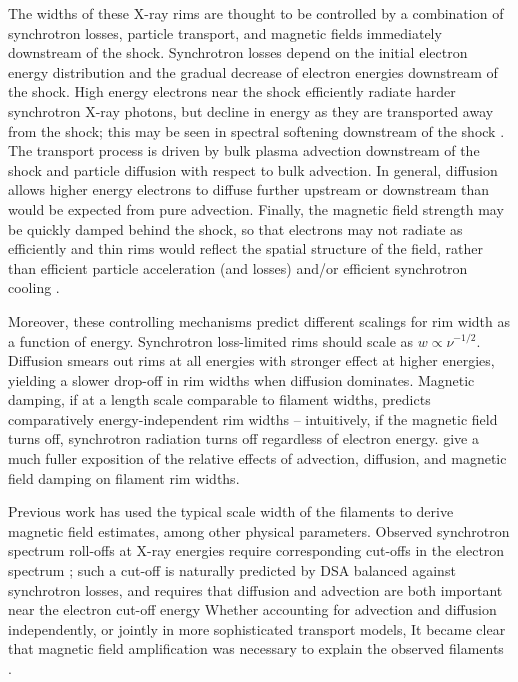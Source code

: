 \documentclass[iop, apj, numberedappendix, twocolappendix]{emulateapj}
\begin{document}
The widths of these X-ray rims are thought to be controlled by a combination of
synchrotron losses, particle transport, and magnetic fields immediately
downstream of the shock.  Synchrotron losses depend on the initial electron
energy distribution and the gradual decrease of electron energies downstream of
the shock.  High energy electrons near the shock efficiently radiate harder
synchrotron X-ray photons, but decline in energy as they are transported away
from the shock; this may be seen in spectral softening downstream of the shock
\citep[e.g.,][]{cassam-chenai2007}.  The transport process is driven by bulk
plasma advection downstream of the shock and particle diffusion with respect to
bulk advection.  In general, diffusion allows higher energy electrons to
diffuse further upstream or downstream than would be expected from pure
advection.  Finally, the magnetic field strength may be quickly damped behind
the shock, so that electrons may not radiate as efficiently and thin rims would
reflect the spatial structure of the field, rather than efficient particle
acceleration (and losses) and/or efficient synchrotron cooling
\citep{pohl2005}.

Moreover, these controlling mechanisms predict different scalings for rim width
as a function of energy.  Synchrotron loss-limited rims should scale as $w
\propto \nu^{-1/2}$.  Diffusion smears out rims at all energies with stronger
effect at higher energies, yielding a slower drop-off in rim widths when
diffusion dominates.  Magnetic damping, if at a length scale comparable to
filament widths, predicts comparatively energy-independent rim widths --
intuitively, if the magnetic field turns off, synchrotron radiation turns off
regardless of electron energy.   \citet{ressler2014}
give a much fuller exposition of the relative effects of advection, diffusion,
and magnetic field damping on filament rim widths.

Previous work has used the typical scale width of the filaments to derive
magnetic field estimates, among other physical parameters.  Observed
synchrotron spectrum roll-offs at X-ray energies require corresponding cut-offs
in the electron spectrum \citep{reynolds1998}; such a cut-off is naturally
predicted by DSA balanced against synchrotron losses, and requires that
diffusion and advection are both important near the electron cut-off energy
 Whether accounting for advection and
diffusion independently, or jointly in more sophisticated transport models, It
became clear that magnetic field amplification was necessary to explain the
observed filaments \citet{bamba2003, vink2003, parizot2006}.  
\end{document}

